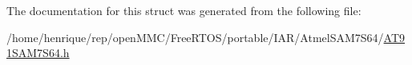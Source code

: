

The documentation for this struct was generated from the following file\-:\begin{DoxyCompactItemize}
\item 
/home/henrique/rep/open\-M\-M\-C/\-Free\-R\-T\-O\-S/portable/\-I\-A\-R/\-Atmel\-S\-A\-M7\-S64/\hyperlink{AT91SAM7S64_8h}{A\-T91\-S\-A\-M7\-S64.\-h}\end{DoxyCompactItemize}
